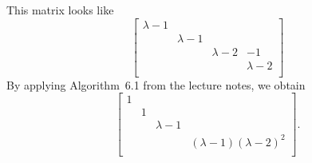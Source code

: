 \begin{solution}
This matrix looks like
\[
\begin{bmatrix}
\lambda - 1 & & &\\
& \lambda- 1 & &\\
&& \lambda- 2 & -1\\
&&&\lambda- 2\\
\end{bmatrix}
\]
By applying Algorithm~6.1 from the lecture notes, we obtain
\[
\begin{bmatrix}
1 & & &\\
& 1 & &\\
&& \lambda- 1 &\\
&&&(\lambda-1)(\lambda- 2)^2\\
\end{bmatrix}.
\]
\end{solution}
